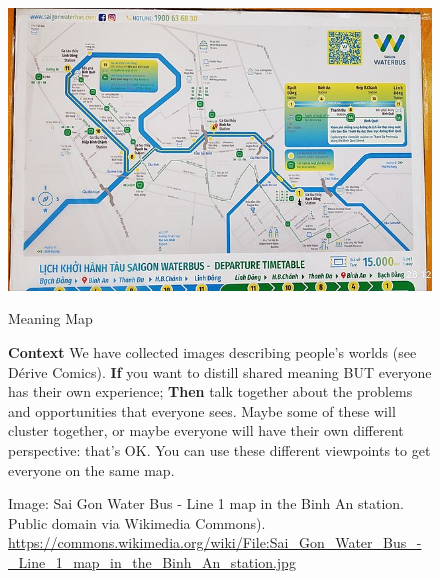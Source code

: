 \documentclass{article}
\begin{document}

\begin{figure}[p]
\begin{adjustbox}{minipage=[c]{\textwidth-10mm},margin= 5mm 15mm 5mm 15mm, frame=1pt, bgcolor=almond,env=center}%
\begin{center}
\includegraphics[trim=10mm 20mm 13mm 10mm, clip,width=.7\paperwidth]{Saigon.jpg}
\end{center}
\begin{center}
\begin{minipage}[t]{0.7\paperwidth}\raggedright
\medskip

{\huge Meaning Map}
\bigskip

\Large
\textbf{Context} We have collected images describing people’s worlds (see {\sc Dérive Comics}).\newline
\textbf{If} you want to distill shared meaning BUT everyone has their own experience;\newline
\textbf{Then} talk together about the problems and opportunities that everyone sees.  Maybe some of these will cluster together, or maybe everyone will have their own different perspective: that’s OK.  You can use these different viewpoints to get everyone on the same map.\newline\smallskip


\end{minipage}
\end{center}
\caption*{Image: Sai Gon Water Bus - Line 1 map in the Binh An station.  Public domain
via Wikimedia Commons).\newline
\url{https://commons.wikimedia.org/wiki/File:Sai_Gon_Water_Bus_-_Line_1_map_in_the_Binh_An_station.jpg}}
\end{adjustbox}
\end{figure}
\end{document}

